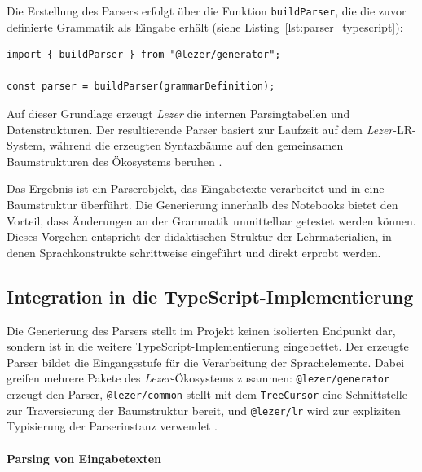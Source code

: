 Die Erstellung des Parsers erfolgt über die Funktion \texttt{buildParser}, die die zuvor definierte Grammatik als Eingabe erhält (siehe Listing~\ref{lst:parser_typescript}):

\begin{listing}[htbp]
    \caption{Erstellung des Parsers in TypeScript}
    \label{lst:parser_typescript}
\begin{verbatim}
import { buildParser } from "@lezer/generator";

const parser = buildParser(grammarDefinition);
\end{verbatim}
\end{listing}

Auf dieser Grundlage erzeugt \emph{Lezer} die internen Parsingtabellen und Datenstrukturen. Der resultierende Parser basiert zur Laufzeit auf dem \emph{Lezer}-LR-System, während die erzeugten Syntaxbäume auf den gemeinsamen Baumstrukturen des Ökosystems beruhen \autocite{lezer_docs}.

Das Ergebnis ist ein Parserobjekt, das Eingabetexte verarbeitet und in eine Baumstruktur überführt. Die Generierung innerhalb des Notebooks bietet den Vorteil, dass Änderungen an der Grammatik unmittelbar getestet werden können. Dieses Vorgehen entspricht der didaktischen Struktur der Lehrmaterialien, in denen Sprachkonstrukte schrittweise eingeführt und direkt erprobt werden.

\subsection{Integration in die TypeScript-Implementierung}
\label{subsec:lezer_ts_integration}

Die Generierung des Parsers stellt im Projekt keinen isolierten Endpunkt dar, sondern ist in die weitere TypeScript-Implementierung eingebettet. Der erzeugte Parser bildet die Eingangsstufe für die Verarbeitung der Sprachelemente. Dabei greifen mehrere Pakete des \emph{Lezer}-Ökosystems zusammen: \texttt{@lezer/generator} erzeugt den Parser, \texttt{@lezer/common} stellt mit dem \texttt{TreeCursor} eine Schnittstelle zur Traversierung der Baumstruktur bereit, und \texttt{@lezer/lr} wird zur expliziten Typisierung der Parserinstanz verwendet \autocite{lezer_docs}.

\paragraph{Parsing von Eingabetexten}

